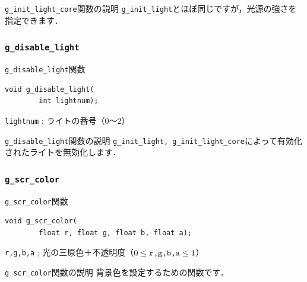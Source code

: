 \documentclass[platex,a4paper,12pt]{jsarticle}%
\begin{document}
\begin{itembox}[l]{\texttt{g\_init\_light\_core}関数の説明}
\texttt{g\_init\_light}とほぼ同じですが，光源の強さを指定できます．
\end{itembox}

\subsubsection{\texttt{g\_disable\_light}}

\begin{itembox}[l]{\texttt{g\_disable\_light}関数}
\begin{verbatim}
void g_disable_light(
        int lightnum);
\end{verbatim}
\verb|lightnum| ; ライトの番号（0〜2）
\end{itembox}

\begin{itembox}[l]{\texttt{g\_disable\_light}関数の説明}
\verb|g_init_light, g_init_light_core|によって有効化されたライトを無効化します．
\end{itembox}


\clearpage
\subsubsection{\texttt{g\_scr\_color}}

\begin{itembox}[l]{\texttt{g\_scr\_color}関数}
\begin{verbatim}
void g_scr_color(
        float r, float g, float b, float a);
\end{verbatim}
\verb|r,g,b,a| ; 光の三原色＋不透明度（$0\leq \verb|r,g,b,a| \leq 1$）
\end{itembox}

\begin{itembox}[l]{\texttt{g\_scr\_color}関数の説明}
	背景色を設定するための関数です．
\end{itembox}
\end{document}
